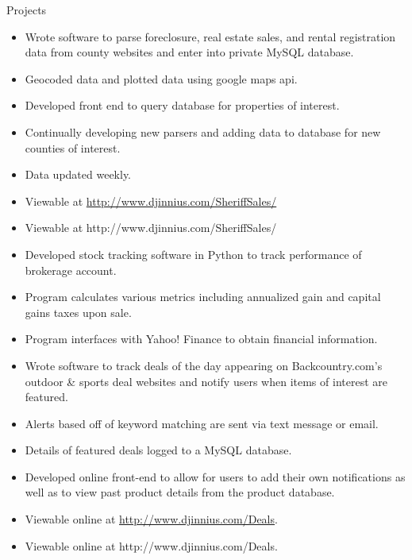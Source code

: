 \begin{category}{Projects}
\begin{itemize}
{\else
{}
\fi

\end{itemize}


\begin{itemize}
\item Wrote software to parse foreclosure, real estate sales, and rental registration data from county websites and enter into private MySQL database.
\item Geocoded data and plotted data using google maps api.
\item Developed front end to query database for properties of interest.
\item Continually developing new parsers and adding data to database for new counties of interest.
\item Data updated weekly.

\ifDjinniusLinks
\ifWebLinks
\item Viewable at \href{ http://www.djinnius.com/SheriffSales/ }{ http://www.djinnius.com/SheriffSales/}
\else
\item Viewable at  http://www.djinnius.com/SheriffSales/
\fi
\fi

\end{itemize}

\begin{itemize}
\item Developed stock tracking software in Python to track performance of brokerage account.
\item Program calculates various metrics including annualized gain and capital gains taxes upon sale.
\item Program interfaces with Yahoo! Finance to obtain financial information.
\end{itemize}



\begin{itemize}
\item Wrote software to track deals of the day appearing on Backcountry.com's outdoor \& sports deal websites and notify users when items of interest are featured.
\item Alerts based off of keyword matching are sent via text message or email.
\item Details of featured deals logged to a MySQL database. 
\item Developed online front-end to allow for users to add their own notifications as well as to view past product details from the product database.
\ifDjinniusLinks
\ifWebLinks
\item Viewable online at \href{ http://www.djinnius.com/Deals/ }{http://www.djinnius.com/Deals}.
\else
\item Viewable online at http://www.djinnius.com/Deals.
\fi
\fi
\end{itemize}


\end{category}

